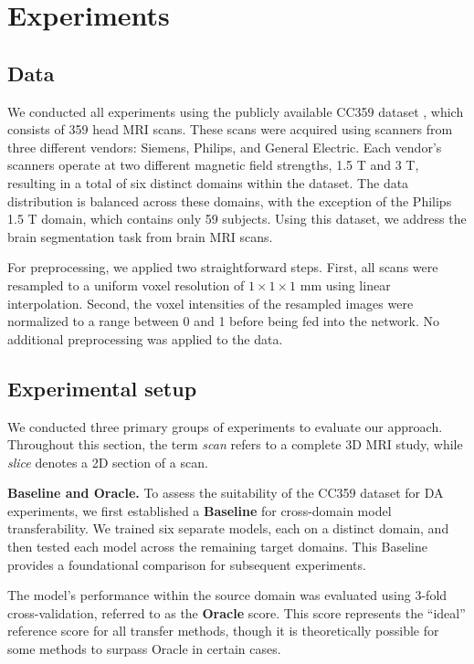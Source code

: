 \section{Experiments}


\subsection{Data}

We conducted all experiments using the publicly available CC359 dataset \cite{cc359}, which consists of 359 head MRI scans. These scans were acquired using scanners from three different vendors: Siemens, Philips, and General Electric. Each vendor's scanners operate at two different magnetic field strengths, 1.5 T and 3 T, resulting in a total of six distinct domains within the dataset. The data distribution is balanced across these domains, with the exception of the Philips 1.5 T domain, which contains only 59 subjects. Using this dataset, we address the brain segmentation task from brain MRI scans.

For preprocessing, we applied two straightforward steps. First, all scans were resampled to a uniform voxel resolution of $1 \times 1 \times 1$ mm using linear interpolation. Second, the voxel intensities of the resampled images were normalized to a range between 0 and 1 before being fed into the network. No additional preprocessing was applied to the data.


\subsection{Experimental setup}

We conducted three primary groups of experiments to evaluate our approach. Throughout this section, the term \textit{scan} refers to a complete 3D MRI study, while \textit{slice} denotes a 2D section of a scan.

\textbf{Baseline and Oracle.} To assess the suitability of the CC359 dataset for DA experiments, we first established a \textbf{Baseline} for cross-domain model transferability. We trained six separate models, each on a distinct domain, and then tested each model across the remaining target domains. This Baseline provides a foundational comparison for subsequent experiments.

The model's performance within the source domain was evaluated using 3-fold cross-validation, referred to as the \textbf{Oracle} score. This score represents the ``ideal'' reference score for all transfer methods, though it is theoretically possible for some methods to surpass Oracle in certain cases.

